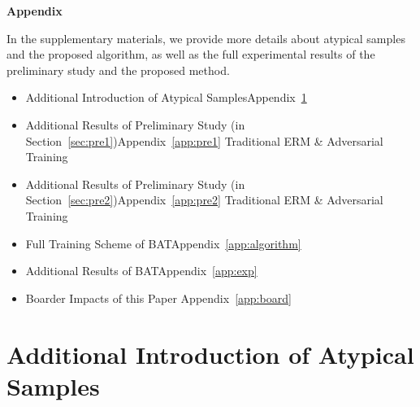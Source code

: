 
\appendix
\newpage
\begin{center}
\large{\bf{Appendix}}
\end{center}

In the supplementary materials, we provide more details about atypical samples and the proposed algorithm, as well as the full experimental results of the preliminary study and the proposed method. 
\begin{itemize}
    \item Additional Introduction of Atypical Samples\hfill Appendix~\ref{app:atypical}
    \item Additional Results of Preliminary Study (in Section~\ref{sec:pre1})\hfill Appendix~\ref{app:pre1}
    \subitem Traditional ERM \& Adversarial Training
    \item Additional Results of Preliminary Study (in Section~\ref{sec:pre2})\hfill Appendix~\ref{app:pre2}
    \subitem Traditional ERM \& Adversarial Training
    \item Full Training Scheme of BAT\hfill Appendix~\ref{app:algorithm}
    \item Additional Results of BAT\hfill Appendix~\ref{app:exp}
    \item Boarder Impacts of this Paper \hfill Appendix~\ref{app:board}
\end{itemize}

\section{Additional Introduction of Atypical Samples}\label{app:atypical}

